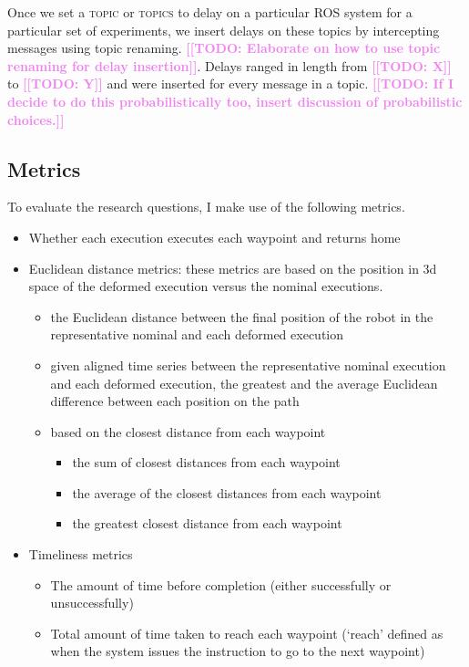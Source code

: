 \documentclass[conference]{IEEEtran}
\newcommand{\todo}[1]{\textcolor{violet}{{\bfseries [[TODO: #1]]}}}
\newcommand{\tool}[1]{\textsc{#1}}
\begin{document}
Once we set a \tool{topic} or \tool{topics} to delay on a particular \tool{\ac{ROS}}
system for a particular set of experiments, we insert delays on these topics by
intercepting messages using topic renaming. \todo{Elaborate on how to use topic renaming for delay insertion}. 
Delays ranged in length from \todo{X} to \todo{Y} and were inserted for every message 
in a topic. \todo{If I decide to do this probabilistically too, insert discussion of 
probabilistic choices.}

\subsection{Metrics}
\label{sec:timing-methodology-metrics}
To evaluate the research questions, I make use of the following metrics.

\begin{itemize}

\item Whether each execution executes each waypoint and returns home
\item Euclidean distance metrics: these metrics are based on the position in 3d space of the deformed execution versus the nominal executions.
\begin{itemize}

\item the Euclidean distance between the final position of the robot in the representative nominal and each deformed execution
\item given aligned time series between the representative nominal execution and each deformed execution, the greatest and the average Euclidean difference between each position on the path
\item based on the closest distance from each waypoint
\begin{itemize}

\item the sum of closest distances from each waypoint
\item the average of the closest distances from each waypoint
\item the greatest closest distance from each waypoint
\end{itemize}


\end{itemize}
\item Timeliness metrics
\begin{itemize}

\item The amount of time before completion (either successfully or unsuccessfully)
\item Total amount of time taken to reach each waypoint (`reach' defined as when the system issues the instruction to go to the next waypoint)
\end{itemize}

\end{itemize}
\end{document}

